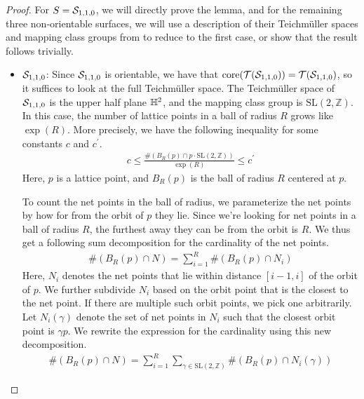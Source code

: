 \documentclass[12pt, reqno]{amsart}
\begin{document}
\begin{proof}
  For $S = \mathcal{S}_{1,1,0}$, we will directly prove the lemma, and for the remaining three non-orientable surfaces, we will use a description of their Teichmüller spaces and mapping class groups from \textcite{gendulphe2017whats} to reduce to the first case, or show that the result follows trivially.
  \begin{itemize}
  \item $\mathcal{S}_{1,1,0}$: Since $\mathcal{S}_{1,1,0}$ is orientable, we have that $\mathrm{core(\mathcal{T}(\mathcal{S}_{1,1,0}))} = \mathcal{T}(\mathcal{S}_{1,1,0})$, so it suffices to look at the full Teichmüller space.
    The Teichmüller space of $\mathcal{S}_{1,1,0}$ is the upper half plane $\mathbb{H}^2$, and the mapping class group is $\mathrm{SL}(2, \mathbb{Z})$.
    In this case, the number of lattice points in a ball of radius $R$ grows like $\exp(R)$.
    More precisely, we have the following inequality for some constants $c$ and $c^\prime$.
    \begin{align}
      c \leq \frac{\#\left( B_R(p) \cap p \cdot \mathrm{SL}(2, \mathbb{Z}) \right)}{\exp(R)} \leq c^{\prime} \label{eq:lattice-point-count}
    \end{align}
    Here, $p$ is a lattice point, and $B_R(p)$ is the ball of radius $R$ centered at $p$.

    To count the net points in the ball of radius, we parameterize the net points by how for from the orbit of $p$ they lie. Since we're looking for net points in a ball of radius $R$, the furthest away they can be from the orbit is $R$.
    We thus get a following sum decomposition for the cardinality of the net points.
    \begin{align*}
      \#\left( B_R(p) \cap N \right) = \sum_{i=1}^R \#\left( B_R(p) \cap N_i \right)
    \end{align*}
    Here, $N_i$ denotes the net points that lie within distance $[i-1, i]$ of the orbit of $p$.
    We further subdivide $N_i$ based on the orbit point that is the closest to the net point. If there are multiple such orbit points, we pick one arbitrarily.
    Let $N_i(\gamma)$ denote the set of net points in $N_i$ such that the closest orbit point is $\gamma p$.
    We rewrite the expression for the cardinality using this new decomposition.
    \begin{align}
      \#\left( B_R(p) \cap N \right) = \sum_{i=1}^R \sum_{\gamma \in \mathrm{SL}(2, \mathbb{Z})} \#\left( B_R(p) \cap N_i(\gamma) \right) \label{eq:net-point-count}
    \end{align}


\end{itemize}
\end{proof}
\end{document}
